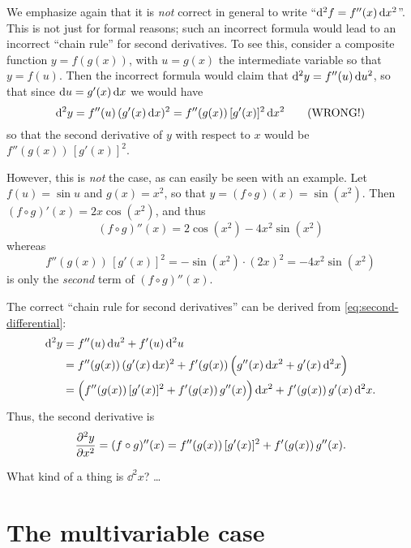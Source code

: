 \documentclass[12pt]{amsart}
\begin{document}
\begin{rmk}
  We emphasize again that it is \emph{not} correct in general to write ``$\mathrm{d}^2f = f''(x) \,\mathrm{d} x^2$''.
  This is not just for formal reasons; such an incorrect formula would lead to an incorrect ``chain rule'' for second derivatives.
  To see this, consider a composite function $y = f(g(x))$, with $u = g(x)$ the intermediate variable so that $y = f(u)$.
  Then the incorrect formula would claim that $\mathrm{d}^2y = f''(u)\,\mathrm{d} u^2 $, so that since $\mathrm{d} u = g'(x) \,\mathrm{d} x$ we would have
  \[ \mathrm{d}^2y = f''(u)\,(g'(x)\,\mathrm{d} x)^2 = f''(g(x))\, [g'(x)]^2 \,\mathrm{d} x^2 \qquad\text{(WRONG!)} \]
  so that the second derivative of $y$ with respect to $x$ would be $f''(g(x))\, [g'(x)]^2$.

  However, this is \emph{not} the case, as can easily be seen with an example.
  Let $f(u) = \sin u$ and $g(x) = x^2$, so that $y = (f\circ g)(x) = \sin(x^2)$.
  Then $(f\circ g)'(x) = 2x\cos (x^2)$, and thus
  \[ (f\circ g)''(x) = 2 \cos (x^2) - 4x^2 \sin(x^2) \]
  whereas
  \[ f''(g(x))\, [g'(x)]^2 = -\sin(x^2) \cdot (2x)^2 = -4x^2\sin(x^2) \]
  is only the \emph{second} term of $(f\circ g)''(x)$.

  The correct ``chain rule for second derivatives'' can be derived from \cref{eq:second-differential}:
  \begin{align*}
    \mathrm{d}^2y &= f''(u) \,\mathrm{d} u^2 + f'(u) \,\mathrm{d}^2u\\
    &= f''(g(x)) \, (g'(x) \, \mathrm{d} x)^2 + f'(g(x)) \, \Big(g''(x) \, \mathrm{d} x^2 + g'(x) \, \mathrm{d}^2 x\Big)\\
    &= \Big( f''(g(x)) \,[g'(x)]^2 + f'(g(x))\, g''(x)\Big) \, \mathrm{d} x^2 + f'(g(x))\, g'(x)\,\mathrm{d}^2x.
  \end{align*}
  Thus, the second derivative is
  \[ \frac{\partial^2 y}{\partial x^2} = (f\circ g)''(x) = f''(g(x)) \,[g'(x)]^2 + f'(g(x))\, g''(x). \]
\end{rmk}

What kind of a thing is $\dd^2x$? \dots %

\section{The multivariable case}
\label{sec:multivariable-second-differentials}

\end{document}
